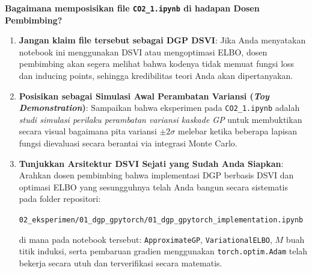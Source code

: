\documentclass[11pt,a4paper]{article}
\begin{document}
\begin{alertbox}
\textbf{Bagaimana memposisikan file \texttt{CO2\_1.ipynb} di hadapan Dosen Pembimbing?}
\begin{enumerate}\setlength{\itemsep}{2pt}
    \item \textbf{Jangan klaim file tersebut sebagai DGP DSVI}: Jika Anda menyatakan notebook ini menggunakan DSVI atau mengoptimasi ELBO, dosen pembimbing akan segera melihat bahwa kodenya tidak memuat fungsi loss dan inducing points, sehingga kredibilitas teori Anda akan dipertanyakan.
    \item \textbf{Posisikan sebagai Simulasi Awal Perambatan Variansi (\textit{Toy Demonstration})}: Sampaikan bahwa eksperimen pada \texttt{CO2\_1.ipynb} adalah \textit{studi simulasi perilaku perambatan variansi kaskade GP} untuk membuktikan secara visual bagaimana pita variansi $\pm 2\sigma$ melebar ketika beberapa lapisan fungsi dievaluasi secara berantai via integrasi Monte Carlo.
    \item \textbf{Tunjukkan Arsitektur DSVI Sejati yang Sudah Anda Siapkan}: Arahkan dosen pembimbing bahwa implementasi DGP berbasis DSVI dan optimasi ELBO yang sesungguhnya telah Anda bangun secara sistematis pada folder repositori:
    \begin{center}
        \texttt{02\_eksperimen/01\_dgp\_gpytorch/01\_dgp\_gpytorch\_implementation.ipynb}
    \end{center}
    di mana pada notebook tersebut: \texttt{ApproximateGP}, \texttt{VariationalELBO}, $M$ buah titik induksi, serta pembaruan gradien menggunakan \texttt{torch.optim.Adam} telah bekerja secara utuh dan terverifikasi secara matematis.
\end{enumerate}
\end{alertbox}
\end{document}
